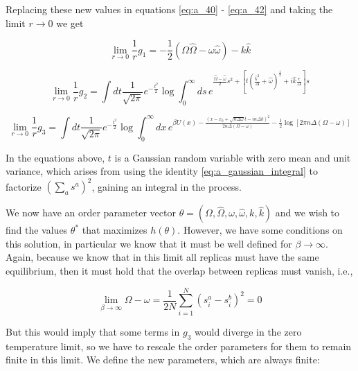 Replacing these new values in equations \eqref{eq:a_40} - \eqref{eq:a_42} and taking the limit $r\to 0$ we get

\begin{equation}
  \label{eq:a_46}
  \lim_{r\to 0} \frac{1}{r} g_1 = -\frac{1}{2}\left(\Omega\hat{\Omega}
    - \omega \hat{\omega}\right) - k\hat{k}
\end{equation}

\begin{equation}
  \label{eq:a_47}
  \lim_{r\to 0} \frac{1}{r} g_2 = \int dt \frac{1}{\sqrt{2\pi}}
  e^{-\frac{t^2}{2}} \log \int_0^\infty ds \, e^{\frac{\hat{\Omega} -
      \hat{\omega}}{2} s^2 + \left[t\left(\frac{\hat{k}^2}{\Delta} +
      \hat{\omega}\right)^{\frac{1}{2}} +
    i\hat{k}\frac{\epsilon}{\Delta}\right] s}
\end{equation}

\begin{equation}
  \label{eq:a_47_2}
  \lim_{r\to 0} \frac{1}{r} g_3 = \int dt \frac{1}{\sqrt{2\pi}}
  e^{-\frac{t^2}{2}} \log \int_0^\infty dx \, e^{\beta U(x) -
    \frac{\left(x-x_0 + \sqrt{n\Delta \omega} t - i n \Delta
        k\right)^2}{2n\Delta(\Omega - \omega)} - \frac{1}{2} \log[2\pi
    n \Delta(\Omega - \omega)]}
\end{equation}

In the equations above, $t$ is a Gaussian random variable with zero mean and unit variance, which arises from using the identity \eqref{eq:a_gaussian_integral} to factorize $\left(\sum_a s^a\right)^2$, gaining an integral in the process.

We now have an order parameter vector $\theta = (\Omega, \hat{\Omega}, \omega, \hat{\omega}, k, \hat{k})$ and we wish to find the values $\theta^\ast$ that maximizes $h(\theta)$. However, we have some conditions on this solution, in particular we know that it must be well defined for $\beta \to \infty$. Again, because we know that in this limit all replicas must have the same equilibrium, then it must hold that the overlap between replicas must vanish, i.e.,

\begin{equation}
  \lim_{\beta\to \infty} \Omega - \omega = \frac{1}{2N} \sum_{i=1}^N \left(s_i^a - s_i^b \right)^2 = 0
\end{equation}

But this would imply that some terms in $g_3$ would diverge in the zero temperature limit, so we have to rescale the order parameters for them to remain finite in this limit. We define the new parameters, which are always finite:


